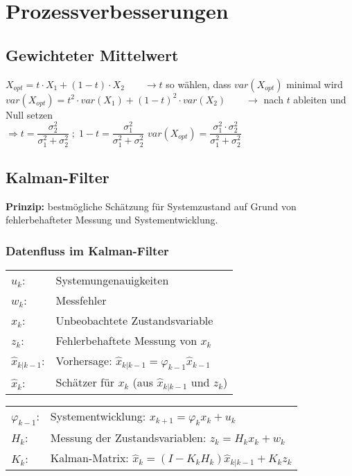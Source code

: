 \section{Prozessverbesserungen}
\subsection{Gewichteter Mittelwert}
	$\boxed{X_{opt} = t\cdot X_1 + (1-t) \cdot X_2} \qquad \rightarrow t$ so wählen, dass $var(X_{opt})$ minimal wird\\


	\hspace*{1cm} $var(X_{opt}) = t^2 \cdot var(X_1) + (1-t)^2 \cdot var(X_2) \qquad \rightarrow$ nach $t$ ableiten und Null setzen \\  
	
	$\Rightarrow \boxed{t = \dfrac{\sigma_2^2}{\sigma_1^2 + \sigma_2^2}} \; ; \; \boxed{1-t = \dfrac{\sigma_1^2}{\sigma_1^2 + \sigma_2^2}}$
	\hspace{1cm} $var(X_{opt}) = \dfrac{\sigma_1^2 \cdot \sigma_2^2}{\sigma_1^2 + \sigma_2^2}$

\subsection{Kalman-Filter}
	\textbf{Prinzip:} bestmögliche Schätzung für Systemzustand auf Grund von fehlerbehafteter
	Messung und Systementwicklung. \\

	\subsubsection{Datenfluss im Kalman-Filter}
		
	
	\begin{minipage}{8cm}
		\begin{tabular}{ll}
			$u_k$: & Systemungenauigkeiten \\
			$w_k$: & Messfehler \\
			$x_k$: & Unbeobachtete Zustandsvariable \\
			$z_k$: & Fehlerbehaftete Messung von $x_k$ \\
			$\hat{x}_{k|k-1}$: & Vorhersage: $\hat{x}_{k|k-1} = \varphi_{k-1} \hat{x}_{k-1}$\\
			$\hat{x}_k$: & Schätzer für $x_k$ (aus $\hat{x}_{k|k-1}$ und $z_k$)\\
		\end{tabular}
	\end{minipage}
	\begin{minipage}{8cm}
		\begin{tabular}{ll}
			$\varphi_{k-1}$: & Systementwicklung: $x_{k+1}=\varphi_k x_k + u_k$ \\
			$H_k$: & Messung der Zustandsvariablen: $z_k = H_k x_k + w_k$ \\
			$K_k$: & Kalman-Matrix: $\hat{x}_k = (I-K_k H_k)\hat{x}_{k|k-1} + K_k z_k$ \\
		\end{tabular}
	\end{minipage}
	
